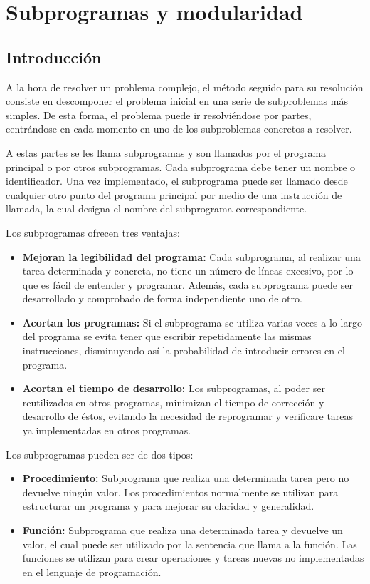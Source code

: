\chapter{Subprogramas y modularidad}
\setcounter{section}{0}
\section{Introducción}
A la hora de resolver un problema complejo, el método seguido para su resolución consiste en descomponer el problema inicial en una serie de subproblemas más simples. De esta forma, el problema puede ir resolviéndose por partes, centrándose en cada momento en uno de los subproblemas concretos a resolver.

A estas partes se les llama subprogramas y son llamados por el programa principal o por otros subprogramas. Cada subprograma debe tener un nombre o identificador. Una vez implementado, el subprograma puede ser llamado desde cualquier otro punto del programa principal por medio de una instrucción de llamada, la cual designa el nombre del subprograma correspondiente.

Los subprogramas ofrecen tres ventajas:
\begin{itemize}
	\item \textbf{Mejoran la legibilidad del programa:} Cada subprograma, al realizar una tarea determinada y concreta, no tiene un número de líneas excesivo, por lo que es fácil de entender y programar. Además, cada subprograma puede ser desarrollado y comprobado de forma independiente uno de otro.
	\item \textbf{Acortan los programas:} Si el subprograma se utiliza varias veces a lo largo del programa se evita tener que escribir repetidamente las mismas instrucciones, disminuyendo así la probabilidad de introducir errores en el programa.
	\item \textbf{Acortan el tiempo de desarrollo:} Los subprogramas, al poder ser reutilizados en otros programas, minimizan el tiempo de corrección y desarrollo de éstos, evitando la necesidad de reprogramar y verificare tareas ya implementadas en otros programas.
\end{itemize}
Los subprogramas pueden ser de dos tipos:
\begin{itemize}
	\item \textbf{Procedimiento:} Subprograma que realiza una determinada tarea pero no devuelve ningún valor. Los procedimientos normalmente se utilizan para estructurar un programa y para mejorar su claridad y generalidad.
	\item \textbf{Función:} Subprograma que realiza una determinada tarea y devuelve un valor, el cual puede ser utilizado por la sentencia que llama a la función. Las funciones se utilizan para crear operaciones y tareas nuevas no implementadas en el lenguaje de programación.
\end{itemize}
